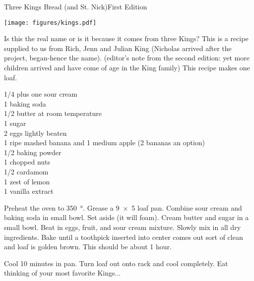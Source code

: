 \begin{entry}{Three Kings Bread (and St. Nick)}{First Edition}

\begin{center}
    \texttt{[image: figures/kings.pdf]}
\end{center}

\begin{open}
  Is this the real name or is it because it comes from three Kings?
  This is a recipe supplied to us from Rich, Jenn and Julian King (Nicholas arrived after the project, began-hence the name). (editor's note from the second edition: yet more children arrived and have come of age in the King family)
  This recipe makes one loaf.
\end{open}
\begin{ingredients}
  \SI{1/4}{\cup} plus one \si{\tblspoon} sour cream \\
  \SI{1}{\teaspoon} baking soda \\
  \SI{1/2}{\cup} butter at room temperature \\
  \SI{1}{\cup} sugar \\
  2 eggs lightly beaten \\
  1 ripe mashed banana and 1 medium apple (2 bananas an option) \\
  \SI{1/2}{\teaspoon} baking powder \\
  \SI{1}{\cup} chopped nuts \\
  \SI{1/2}{\teaspoon} cardamom \\
  1 zest of lemon \\
  \SI{1}{\teaspoon} vanilla extract
\end{ingredients}
Preheat the oven to \SI{350}{\degree}.  Grease a \SI{9x5}{\inch} loaf pan.
Combine sour cream and baking soda in small bowl.  Set aside (it will foam).
Cream butter and sugar in a small bowl.  Beat in eggs, fruit, and sour cream
mixture.  Slowly mix in all dry ingredients.  Bake until a toothpick inserted
into center comes out sort of clean and loaf is golden brown.  This should be
about 1 hour.

Cool 10 minutes in pan. Turn loaf out onto rack and cool completely.  Eat
thinking of your most favorite Kings$\ldots$
\end{entry}

